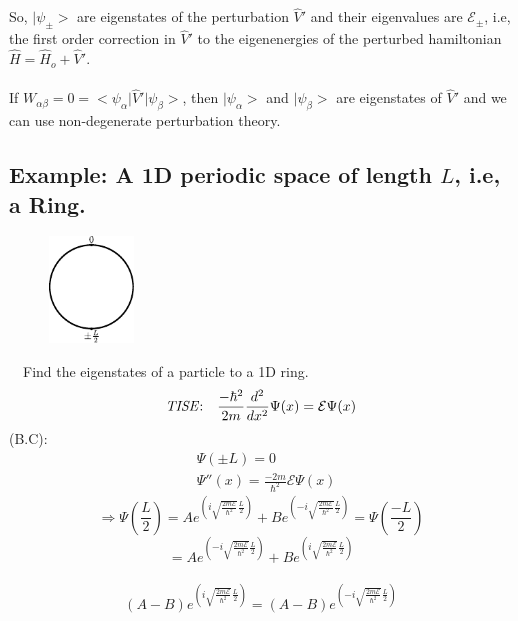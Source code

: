\documentclass[12pt,fancychapters]{report}
\numberwithin{equation}{section}
\begin{document}
So, $\big|\psi_\pm\big>$ are eigenstates of the perturbation $\hat{V}'$ and their eigenvalues
are $\mathcal{E}_\pm$, i.e, the first order correction in $\hat{V}'$ to the eigenenergies 
of the perturbed hamiltonian $\hat{H} = \hat{H}_o + \hat{V}'$.\\
\\
If $W_{\alpha\beta}=0=\big<\psi_\alpha\big|\hat{V}'\big|\psi_\beta\big>$, then $\big|\psi_\alpha
\big>$ and $\big|\psi_\beta\big>$ are eigenstates of $\hat{V}'$ and we can use non-degenerate
perturbation theory. 
\newpage
\subsection{Example: A 1D periodic space of length $L$, i.e, a Ring.}
\begin{figure}
  \begin{center}
    \includegraphics[width=0.2\textwidth]{../Figures/1D_L.pdf}
  \end{center}
\end{figure}
\
\
Find the eigenstates of a particle to a 1D ring. 
\[\text{\emph{TISE}:}\quad \frac{-\hbar^2}{2m}\frac{d^2}{dx^2}\Psi(x) = \mathcal{E}\Psi(x)\]
(B.C): 
\begin{align*}
&\Psi(\pm L) = 0\\
&\Psi''(x)= \frac{-2m}{\hbar^2}\mathcal{E}\Psi(x)
\end{align*}
\[
  \Rightarrow \Psi \left(\frac{L}{2}\right) = Ae^{\left(i\sqrt{\frac{2m\mathcal{E}}{\hbar^2}}
    \frac{L}{2}\right)}+
  Be^{\left(-i\sqrt{\frac{2m\mathcal{E}}{\hbar^2}}\frac{L}{2}\right)}= \Psi\left(\frac{-L}{2}\right)
\]
\[= Ae^{\left(-i\sqrt{\frac{2m\mathcal{E}}{\hbar^2}}\frac{L}{2}\right)} + 
Be^{\left(i\sqrt{\frac{2m\mathcal{E}}{\hbar^2}}\frac{L}{2}\right)}\]\\
\[\left(A-B\right)e^{\left(i\sqrt{\frac{2m\mathcal{E}}{\hbar^2}}\frac{L}{2}\right)}=
\left(A-B\right)e^{\left(-i\sqrt{\frac{2m\mathcal{E}}{\hbar^2}}\frac{L}{2}\right)}\]
\end{document}
